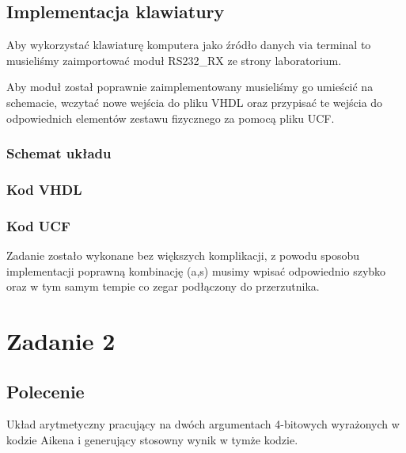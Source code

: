 \documentclass[a4paper,12pt]{extarticle}  %
\begin{document}
\subsection{Implementacja klawiatury}
Aby wykorzystać klawiaturę komputera jako źródło danych via terminal to musieliśmy zaimportować moduł RS232\_RX ze strony laboratorium.

Aby moduł został poprawnie zaimplementowany musieliśmy go umieścić na schemacie, 
wczytać nowe wejścia do pliku VHDL oraz przypisać te wejścia do 
odpowiednich elementów zestawu fizycznego za pomocą pliku UCF.
\subsubsection{Schemat układu}
\begin{figure}[H]
	\centering
\end{figure}
\subsubsection{Kod VHDL}

\subsubsection{Kod UCF}


Zadanie zostało wykonane bez większych komplikacji, z powodu sposobu implementacji poprawną kombinację (a,s) musimy wpisać odpowiednio szybko oraz w tym samym tempie co zegar podłączony do przerzutnika.
\section{Zadanie 2}
\subsection{Polecenie}
Układ arytmetyczny pracujący na dwóch argumentach 4-bitowych wyrażonych w kodzie Aikena
i generujący stosowny wynik w tymże kodzie. 
\end{document}
